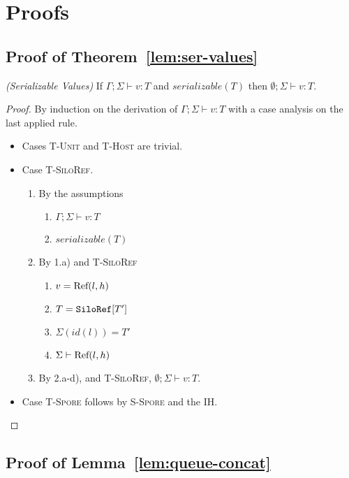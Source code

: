 \section{Proofs}

\subsection{Proof of Theorem~\ref{lem:ser-values}}\label{app:ser-values}

\begin{thmun}
\emph{(Serializable Values)}
If $\Gamma ; \Sigma \vdash v : T$ and $serializable(T)$ then $\emptyset ; \Sigma \vdash v : T$.
\end{thmun}
\begin{proof}
By induction on the derivation of $\Gamma ; \Sigma \vdash v : T$ with a case analysis on the last applied rule.

\begin{itemize}
\item Cases \textsc{T-Unit} and \textsc{T-Host} are trivial.

\item Case \textsc{T-SiloRef}.
\begin{enumerate}
\item By the assumptions
  \begin{enumerate}[label=(\alph*)]
  \item $\Gamma ; \Sigma \vdash v : T$
  \item $serializable(T)$
  \end{enumerate}
\item By 1.a) and \textsc{T-SiloRef}
  \begin{enumerate}[label=(\alph*)]
  \item $v = {\textrm{Ref}(l, h)}$
  \item $T = \texttt{SiloRef}[T']$
  \item $\Sigma(id(l)) = T'$
  \item $\Sigma \vdash {\textrm{Ref}(l, h)}$
  \end{enumerate}
\item By 2.a-d), and \textsc{T-SiloRef}, $\emptyset ; \Sigma \vdash v : T$.
\end{enumerate}

\item Case \textsc{T-Spore} follows by \textsc{S-Spore} and the IH.
\end{itemize}
\end{proof}


\subsection{Proof of Lemma~\ref{lem:queue-concat}}\label{app:queue-concat}

